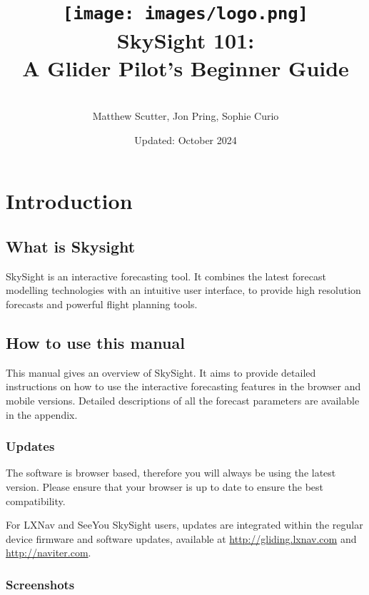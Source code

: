 \documentclass[11pt,a4paper]{article}
\title{\texttt{[image: images/logo.png]}\\[1cm]SkySight 101: \\[0.5cm]A Glider Pilot's Beginner Guide}
\author{\\Matthew Scutter, Jon Pring, Sophie Curio}
\date{Updated: October 2024}
\begin{document}
\begin{titlepage}
\maketitle
\end{titlepage}

\tableofcontents
\pagebreak

\section{Introduction}
\subsection{What is Skysight}

SkySight is an interactive forecasting tool. It combines the latest forecast modelling technologies with an intuitive user interface, to provide high resolution forecasts and powerful flight planning tools.




\subsection{How to use this manual}

This manual gives an overview of SkySight. It aims to provide detailed instructions on how to use the interactive forecasting features in the browser and mobile versions. Detailed descriptions of all the forecast parameters are available in the appendix.



\subsubsection{Updates}

The software is browser based, therefore you will always be using the latest version. Please ensure that your browser is up to date to ensure the best compatibility.

For LXNav and SeeYou SkySight users, updates are integrated within the regular device firmware and software updates, available at \url{http://gliding.lxnav.com} and \url{http://naviter.com}.

\subsubsection{Screenshots}
\end{document}
